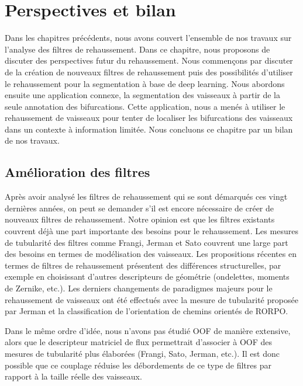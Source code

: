 \chapter{Perspectives et bilan}
\label{sec:Ending}

Dans les chapitres précédents, nous avons couvert l'ensemble de nos travaux sur l'analyse des filtres de rehaussement. Dans ce chapitre, nous proposons de discuter des perspectives futur du rehaussement. Nous commençons par discuter de la création de nouveaux filtres de rehaussement puis des possibilités d'utiliser le rehaussement pour la segmentation à base de deep learning. Nous abordons ensuite une application connexe, la segmentation des vaisseaux à partir de la seule annotation des bifurcations. Cette application, nous a menés à utiliser le rehaussement de vaisseaux pour tenter de localiser les bifurcations des vaisseaux dans un contexte à information limitée. Nous concluons ce chapitre par un bilan de nos travaux.
\section{Amélioration des filtres}
Après avoir analysé les filtres de rehaussement qui se sont démarqués ces vingt dernières années, on peut se demander s'il est encore nécessaire de créer de nouveaux filtres de rehaussement. Notre opinion est que les filtres existants couvrent déjà une part importante des besoins pour le rehaussement. Les mesures de tubularité des filtres comme Frangi, Jerman et Sato couvrent une large part des besoins en termes de modélisation des vaisseaux. Les propositions récentes en termes de filtres de rehaussement présentent des différences structurelles, par exemple en choisissant d'autres descripteurs de géométrie (ondelettes, moments de Zernike, etc.). Les derniers changements de paradigmes majeurs pour le rehaussement de vaisseaux ont été effectués avec la mesure de tubularité proposée par Jerman et la classification de l'orientation de chemins orientés de RORPO.

Dans le même ordre d'idée, nous n'avons pas étudié OOF de manière extensive, alors que le descripteur matriciel de flux permettrait d'associer à OOF des mesures de tubularité plus élaborées (Frangi, Sato, Jerman, etc.). Il est donc possible que ce couplage réduise les débordements de ce type de filtres par rapport à la taille réelle des vaisseaux.

